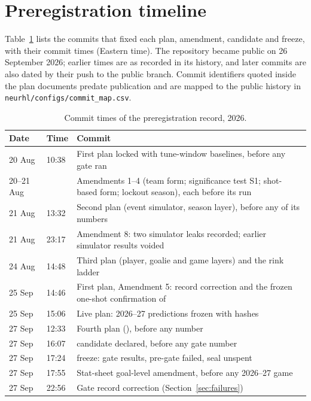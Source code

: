 \section{Preregistration timeline}
\label{app:timeline}

Table~\ref{tab:timeline} lists the commits that fixed each plan, amendment,
candidate and freeze, with their commit times (Eastern time). The repository
became public on 26 September 2026; earlier times are as recorded in its
history, and later commits are also dated by their push to the public branch.
Commit identifiers quoted inside the plan documents predate publication and are
mapped to the public history in \texttt{neurhl/configs/commit\_map.csv}.

\begin{table}[H]
\centering
\small
\caption{Commit times of the preregistration record, 2026.}
\label{tab:timeline}
\begin{tabular}{llp{}}
\toprule
Date & Time & Commit \\
\midrule
20 Aug & 10:38 & First plan locked with tune-window baselines, before any gate ran \\
20--21 Aug & & Amendments 1--4 (team form; significance test S1; shot-based form; lockout season), each before its run \\
21 Aug & 13:32 & Second plan (event simulator, season layer), before any of its numbers \\
21 Aug & 23:17 & Amendment 8: two simulator leaks recorded; earlier simulator results voided \\
24 Aug & 14:48 & Third plan (player, goalie and game layers) and the rink ladder \\
25 Sep & 14:46 & First plan, Amendment 5: record correction and the frozen one-shot confirmation of \neurhlH{} \\
25 Sep & 15:06 & Live plan: 2026--27 predictions frozen with hashes \\
27 Sep & 12:33 & Fourth plan (\neurhlG{}), before any \neurhlG{} number \\
27 Sep & 16:07 & \neurhlG{} candidate declared, before any gate number \\
27 Sep & 17:24 & \neurhlG{} freeze: gate results, pre-gate failed, seal unspent \\
27 Sep & 17:55 & Stat-sheet goal-level amendment, before any 2026--27 game \\
27 Sep & 22:56 & Gate record correction (Section~\ref{sec:failures}) \\
\bottomrule
\end{tabular}
\end{table}

